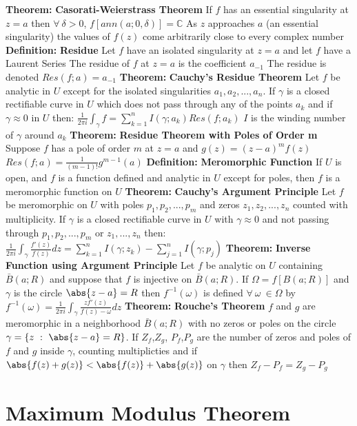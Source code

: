 \documentclass[14pt]{extarticle}
\def\Definition{{\color{blue} \textbf{Definition:} }}
\def\Theorem{{\color{red} \textbf{Theorem:} }}
\begin{document}
\begin{outline}
	\1	\Theorem \textbf{Casorati-Weierstrass Theorem}
		\2	If $f$ has an essential singularity at $z = a$ then $\forall~\delta > 0$,
				$f[ann(a;0,\delta)] = \mathbb{C}$
		\2	As $z$ approaches $a$ (an essential singularity) the values of $f(z)$
				come arbitrarily close to every complex number
	\1	\Definition \textbf{Residue}
		\2	Let $f$ have an isolated singularity at $z = a$ and let $f$ have a 
				Laurent Series
		\2	The residue of $f$ at $z = a$ is the coefficient $a_{-1}$
		\2	The residue is denoted $Res(f;a) = a_{-1}$
	\1	\Theorem	\textbf{Cauchy's Residue Theorem}
		\2	Let $f$ be analytic in $U$ except for the isolated singularities 
				$a_1,a_2,...,a_n$.  If $\gamma$ is a closed rectifiable curve in $U$
				which does not pass through any of the points $a_k$ and if 
				$\gamma \approx 0$ in $U$ then:
		\2	$\frac{1}{2\pi i}\int_{\gamma} f = \sum_{k=1}^n I(\gamma;a_k) Res(f;a_k)$
			\3	$I$ is the winding number of $\gamma$ around $a_k$
	\1	\Theorem \textbf{Residue Theorem with Poles of Order m}
		\2	Suppose $f$ has a pole of order $m$ at $z = a$ and $g(z) = (z-a)^mf(z)$
		\2	$Res(f;a) = \frac{1}{(m-1)!}g^{m-1}(a)$
	\1	\Definition \textbf{Meromorphic Function}
		\2	If $U$ is open, and $f$ is a function defined and analytic in $U$ except
				for poles, then $f$ is a meromorphic function on $U$
	\1	\Theorem \textbf{Cauchy's Argument Principle}
		\2	Let $f$ be meromorphic on $U$ with poles $p_1,p_2,...,p_m$ and zeros
				$z_1,z_2,...,z_n$ counted with multiplicity.  If $\gamma$ is a closed
				rectifiable curve in $U$ with $\gamma \approx 0$ and not passing through
				$p_1,p_2,...,p_m$ or $z_1,...,z_n$ then:
		\2	$\frac{1}{2\pi i} \int_{\gamma} \frac{f'(z)}{f(z)}dz = 
					\sum_{k=1}^n I(\gamma;z_k) - \sum_{j=1}^n I(\gamma;p_j)$
	\1	\Theorem	\textbf{Inverse Function using Argument Principle}
		\2	Let $f$ be analytic on $U$ containing $\bar{B}(a;R)$ and suppose that
				$f$ is injective on $\bar{B}(a;R)$.  If $\Omega = f[B(a;R)]$ and $\gamma$
				is the circle $\abs{z - a} = R$ then $f^{-1}(\omega)$ is defined 
				$\forall~\omega~\in \Omega$ by
		\2	$f^{-1}(\omega) = \frac{1}{2\pi i}\int_{\gamma}\frac{zf'(z)}{f(z) - \omega}dz$
	\1	\Theorem \textbf{Rouche's Theorem}
		\2	$f$ and $g$ are meromorphic in a neighborhood $\bar{B}(a;R)$ with no zeros
				or poles on the circle $\gamma = \{z~:~\abs{z - a} = R\}$.  If $Z_f$,$Z_g$,
				$P_f$,$P_g$ are the number of zeros and poles of $f$ and $g$ inside $\gamma$,
				counting multiplicties and if $\abs{f(z) + g(z)} < \abs{f(z)} + \abs{g(z)}$
				on $\gamma$ then $Z_f - P_f = Z_g - P_g$
\section*{Maximum Modulus Theorem}
\end{outline}
\end{document}
